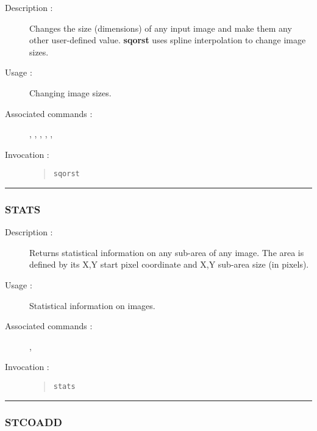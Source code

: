 \begin{description}

\item[Description :] Changes the size (dimensions) of any input image
and make them any other user-defined value.  {\bf sqorst} uses spline
interpolation to change image sizes.

\item[Usage :] Changing image sizes.

\item[Associated commands :] {\tt {}},
{\tt {}}, {\tt {}},
{\tt {}}, {\tt {}},
{\tt {}}

\item[Invocation :]

\begin{quote}{\tt  sqorst }\end{quote}

\end{description}

\hrule
\subsubsection*{\label{STATS}STATS}

\begin{description}

\item[Description :] Returns statistical information on any sub-area of
any image. The area is defined by its X,Y start pixel coordinate and
X,Y sub-area size (in pixels).

\item[Usage :] Statistical information on images.
\item[Associated commands :] {\tt {}},
{\tt {}}
\item[Invocation :]

\begin{quote}{\tt  stats }\end{quote}

\end{description}

\hrule
\subsubsection*{\label{STCOADD}STCOADD}

